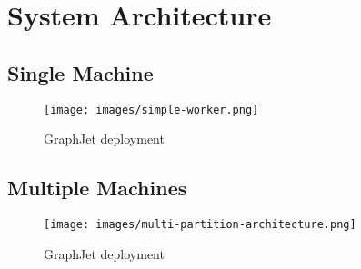 \section{System Architecture}
\label{System Architecture}

\subsection{Single Machine}
\label{Single Machine}

\begin{figure}[!h]
	\centering
	\texttt{[image: images/simple-worker.png]}
	\caption{GraphJet deployment}
	\label{fig:graphJet-deployment}
\end{figure}

\subsection{Multiple Machines}
\label{Multiple Machines}

\begin{figure}[!h]
	\centering
	\texttt{[image: images/multi-partition-architecture.png]}
	\caption{GraphJet deployment}
	\label{fig:graphJet-deployment}
\end{figure}
